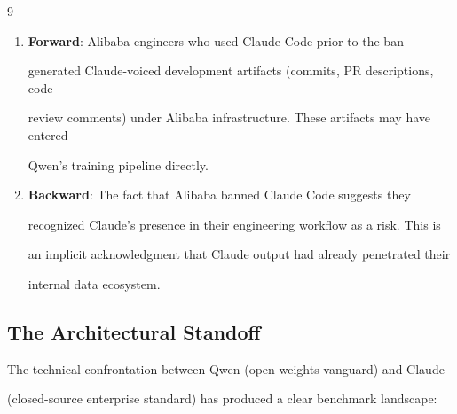 \documentclass[11pt]{article}
\theoremstyle{definition}
\begin{document}
\begin{thebibliography}{9}
\begin{enumerate}
  \item \textbf{Forward}: Alibaba engineers who used Claude Code prior to the ban





    generated Claude-voiced development artifacts (commits, PR descriptions, code





    review comments) under Alibaba infrastructure. These artifacts may have entered





    Qwen's training pipeline directly.





  \item \textbf{Backward}: The fact that Alibaba banned Claude Code suggests they





    recognized Claude's presence in their engineering workflow as a risk. This is





    an implicit acknowledgment that Claude output had already penetrated their





    internal data ecosystem.





\end{enumerate}











\subsection{The Architectural Standoff}











The technical confrontation between Qwen (open-weights vanguard) and Claude





(closed-source enterprise standard) has produced a clear benchmark landscape:












\end{thebibliography}
\end{document}
